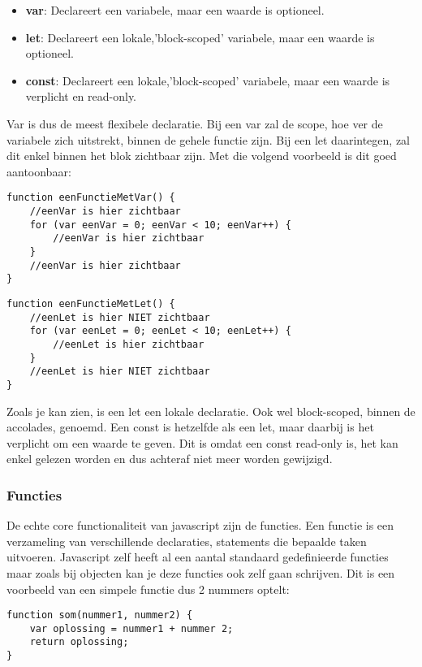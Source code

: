\begin{itemize}
	\item \textbf{var}: Declareert een variabele, maar een waarde is optioneel.
	\item \textbf{let}: Declareert een lokale,'block-scoped' variabele, maar een waarde is optioneel.
	\item \textbf{const}: Declareert een lokale,'block-scoped' variabele, maar een waarde is verplicht en read-only.
\end{itemize}

Var is dus de meest flexibele declaratie. Bij een var zal de scope, hoe ver de variabele zich uitstrekt, binnen de gehele functie zijn. Bij een let daarintegen, zal dit enkel binnen het blok zichtbaar zijn. Met die volgend voorbeeld is dit goed aantoonbaar:

\begin{lstlisting}[frame=single, caption=Een functie met var]
function eenFunctieMetVar() {
	//eenVar is hier zichtbaar
	for (var eenVar = 0; eenVar < 10; eenVar++) {
		//eenVar is hier zichtbaar
	}
	//eenVar is hier zichtbaar
}
\end{lstlisting}

\begin{lstlisting}[frame=single, caption=Een functie met let]
function eenFunctieMetLet() {
	//eenLet is hier NIET zichtbaar
	for (var eenLet = 0; eenLet < 10; eenLet++) {
		//eenLet is hier zichtbaar
	}
	//eenLet is hier NIET zichtbaar
}
\end{lstlisting}

Zoals je kan zien, is een let een lokale declaratie. Ook wel block-scoped, binnen de accolades, genoemd. Een const is hetzelfde als een let, maar daarbij is het verplicht om een waarde te geven. Dit is omdat een const read-only is, het kan enkel gelezen worden en dus achteraf niet meer worden gewijzigd.

\subsubsection{Functies}
\label{sssec:functies}
De echte core functionaliteit van javascript zijn de functies. Een functie is een verzameling van verschillende declaraties, statements die bepaalde taken uitvoeren. Javascript zelf heeft al een aantal standaard gedefinieerde functies maar zoals bij objecten kan je deze functies ook zelf gaan schrijven. Dit is een voorbeeld van een simpele functie dus 2 nummers optelt:

\begin{lstlisting}[frame=single, caption=Een functie die 2 getallen optelt]
function som(nummer1, nummer2) {
	var oplossing = nummer1 + nummer 2;
	return oplossing;
}
\end{lstlisting}

